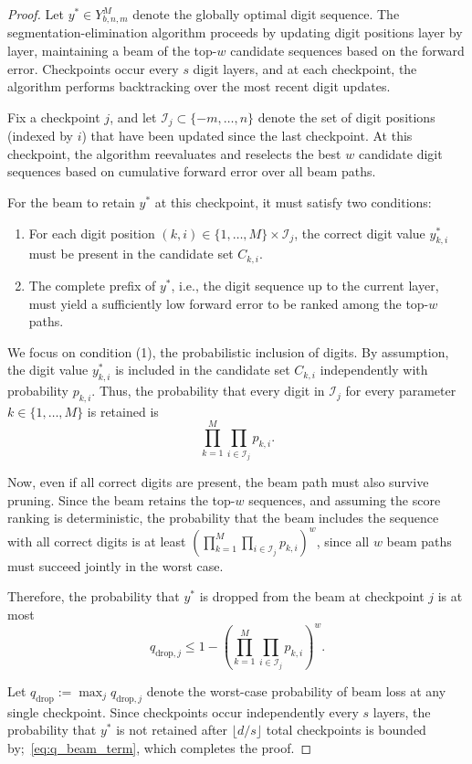 \documentclass[aps,twocolumn,superscriptaddress,nofootinbib]{revtex4}
\begin{document}
\begin{proof}
Let \( y^* \in Y_{b,n,m}^M \) denote the globally optimal digit sequence. The segmentation-elimination algorithm proceeds by updating digit positions layer by layer, maintaining a beam of the top-\( w \) candidate sequences based on the forward error. Checkpoints occur every \( s \) digit layers, and at each checkpoint, the algorithm performs backtracking over the most recent digit updates.

Fix a checkpoint \( j \), and let \( \mathcal{I}_j \subset \{-m, \dots, n\} \) denote the set of digit positions (indexed by \( i \)) that have been updated since the last checkpoint. At this checkpoint, the algorithm reevaluates and reselects the best \( w \) candidate digit sequences based on cumulative forward error over all beam paths.

For the beam to retain \( y^* \) at this checkpoint, it must satisfy two conditions:
\begin{enumerate}
    \item For each digit position \( (k, i) \in \{1, \dots, M\} \times \mathcal{I}_j \), the correct digit value \( y^*_{k,i} \) must be present in the candidate set \( C_{k,i} \).
    \item The complete prefix of \( y^* \), i.e., the digit sequence up to the current layer, must yield a sufficiently low forward error to be ranked among the top-\( w \) paths.
\end{enumerate}

We focus on condition (1), the probabilistic inclusion of digits. By assumption, the digit value \( y^*_{k,i} \) is included in the candidate set \( C_{k,i} \) independently with probability \( p_{k,i} \). Thus, the probability that every digit in \( \mathcal{I}_j \) for every parameter \( k \in \{1, \dots, M\} \) is retained is
\begin{equation}
\prod_{k=1}^M \prod_{i \in \mathcal{I}_j} p_{k,i}.
\end{equation}

Now, even if all correct digits are present, the beam path must also survive pruning. Since the beam retains the top-\( w \) sequences, and assuming the score ranking is deterministic, the probability that the beam includes the sequence with all correct digits is at least \( \left(\prod_{k=1}^M \prod_{i \in \mathcal{I}_j} p_{k,i}\right)^w \), since all \( w \) beam paths must succeed jointly in the worst case.

Therefore, the probability that \( y^* \) is dropped from the beam at checkpoint \( j \) is at most
\begin{equation}
q_{\text{drop},j} \leq 1 - \left(\prod_{k=1}^M \prod_{i \in \mathcal{I}_j} p_{k,i}\right)^w.
\end{equation}

Let \( q_{\text{drop}} := \max_j q_{\text{drop},j} \) denote the worst-case probability of beam loss at any single checkpoint. Since checkpoints occur independently every \( s \) layers, the probability that \( y^* \) is not retained after \( \lfloor d/s \rfloor \) total checkpoints is bounded by;~\eqref{eq:q_beam_term}, which completes the proof.
\end{proof}
\end{document}
